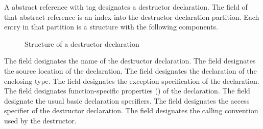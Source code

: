  A  abstract reference with tag  designates a destructor declaration.
The  field of that abstract reference is an index into the destructor declaration partition.
Each entry in that partition is a structure with the following components.
%
\begin{figure}[H]
	\centering
	\caption{Structure of a destructor declaration}
	\label{fig:ifc-destructor-decl-structure}
\end{figure}
%
The  field designates the name of the destructor declaration.
The  field designates the source location of the declaration.
The  field designates the declaration of the enclosing type.
The  field designates the exception specification of the declaration.
The  field designates function-specific properties () of the declaration.
The  field designate the usual basic declaration specifiers.
The  field designates the access specifier of the destructor declaration.
The  field designates the calling convention used by the destructor.






\subsection{} 
\label{sec:ifc:DeclSort:Reference}

